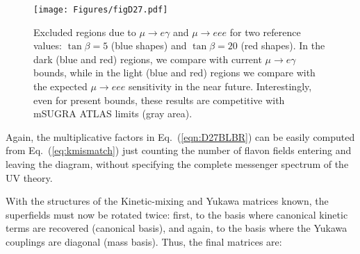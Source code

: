 \documentclass[a4paper,11pt]{article}
\newcommand{\eq}[1]{Eq.~(\ref{#1})}
\begin{document}
\begin{figure}[h!]
  \centering
  \captionsetup{width=.9\linewidth}
  \vspace{-0.75cm}
  \texttt{[image: Figures/figD27.pdf]}
  \caption{\label{fig:D27}Excluded regions due to $\mu \to e \gamma$  and $\mu\to eee$ for two reference values: $\tan\beta = 5$ (blue shapes)
and $\tan \beta = 20$ (red shapes). In the dark (blue and red) regions, we compare with current $\mu \to e \gamma$  bounds,
while in the light (blue and red) regions we compare with the expected  $\mu\to eee$ sensitivity in the near future.
Interestingly, even for present bounds, these results are competitive with mSUGRA ATLAS limits (gray area).}
\end{figure}

Again, the multiplicative factors in \eq{eqn:D27BLBR} can be easily computed from \eq{eq:kmismatch} just counting the number of flavon fields entering and leaving the diagram, without specifying the complete messenger spectrum of the UV theory.

With the structures of the Kinetic-mixing and Yukawa matrices known, the superfields must now be rotated twice: first, to the basis where canonical kinetic terms are recovered (canonical basis), and again, to the basis where the Yukawa couplings are diagonal (mass basis). Thus, the final matrices are:
\end{document}
